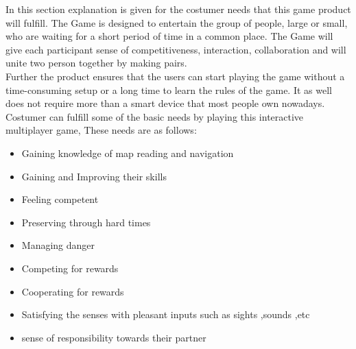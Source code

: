 


In this section explanation is given for the costumer needs that this game product will fulfill. The Game  is designed to entertain the group of people, large or small, who are waiting for a short period of time in a common place. The Game will give each participant sense of competitiveness, interaction, collaboration and will unite two person together by making pairs. \\
Further the product ensures that the users can start playing the game without a time-consuming setup or a long time to learn the rules of the game. It as
 well does not require more than a smart device that most people own nowadays. \\
 Costumer can fulfill some of the basic needs by playing this interactive multiplayer game, These needs are as follows:
 \begin{itemize}
   	\item Gaining knowledge of map reading and navigation
   	\item Gaining and Improving their skills
   	\item Feeling competent
   	\item Preserving through hard times
   	\item Managing danger
   	\item Competing for rewards
   	\item Cooperating for rewards
   	\item Satisfying the senses with pleasant inputs such as sights ,sounds ,etc
   	\item sense of responsibility towards their partner
   \end{itemize}  

  
     
